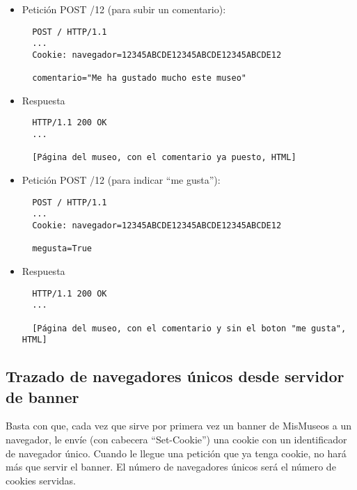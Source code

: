 \begin{itemize}
\item Petición POST /12 (para subir un comentario):

\begin{verbatim}
  POST / HTTP/1.1
  ...
  Cookie: navegador=12345ABCDE12345ABCDE12345ABCDE12
  
  comentario="Me ha gustado mucho este museo"
\end{verbatim}

\item Respuesta

\begin{verbatim}
  HTTP/1.1 200 OK
  ...

  [Página del museo, con el comentario ya puesto, HTML]
\end{verbatim}

\item Petición POST /12 (para indicar ``me gusta''):

\begin{verbatim}
  POST / HTTP/1.1
  ...
  Cookie: navegador=12345ABCDE12345ABCDE12345ABCDE12
  
  megusta=True
\end{verbatim}

\item Respuesta

\begin{verbatim}
  HTTP/1.1 200 OK
  ...

  [Página del museo, con el comentario y sin el boton "me gusta", HTML]
\end{verbatim}

\end{itemize}


\subsection*{Trazado de navegadores únicos desde servidor de banner}

Basta con que, cada vez que sirve por primera vez un banner de MisMuseos a un navegador, le envíe (con cabecera ``Set-Cookie'') una cookie con un identificador de navegador único. Cuando le llegue una petición que ya tenga cookie, no hará más que servir el banner. El número de navegadores únicos será el número de cookies servidas.



